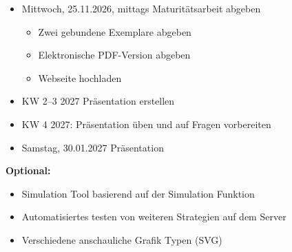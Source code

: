 \documentclass[
  ngerman,
  a4paper,
  DIV=11,
  oneside]{scrreprt}
\providecommand{\tightlist}{%
  \setlength{\itemsep}{0pt}\setlength{\parskip}{0pt}}
\begin{document}
\begin{itemize}
  \begin{itemize}
  \tightlist
  \item[$\square$]
    Abstract fertigstellen und elektronisch abgeben
  \item[$\square$]
    Titelblatt kontrollieren
  \item[$\square$]
    Inhaltsverzeichnis und Seitenzahlen kontrollieren
  \item[$\square$]
    Abbildungs- und Tabellenverzeichnis kontrollieren
  \item[$\square$]
    Literatur- und Quellenverzeichnis kontrollieren
  \item[$\square$]
    Ehrlichkeitserklärung ausfüllen, unterschreiben und als letzte Seite
    einfügen
  \item[$\square$]
    PDF exportieren und vollständig kontrollieren
  \item[$\square$]
    Zwei gebundene Exemplare drucken lassen
  \item[$\square$]
    Eigenes drittes Exemplar für die Präsentation vorbereiten
  \end{itemize}
\item[$\square$]
   Mittwoch, 25.11.2026, mittags Maturitätsarbeit
  abgeben

  \begin{itemize}
  \tightlist
  \item[$\square$]
    Zwei gebundene Exemplare abgeben
  \item[$\square$]
    Elektronische PDF-Version abgeben
  \item[$\square$]
    Webseite hochladen
  \end{itemize}
\item[$\square$]
   KW 2--3 2027 Präsentation erstellen
\item[$\square$]
   KW 4 2027: Präsentation üben und auf Fragen
  vorbereiten
\item[$\square$]
   Samstag, 30.01.2027 Präsentation
\end{itemize}

\textbf{Optional:}

\begin{itemize}
\tightlist
\item[$\square$]
   Simulation Tool basierend auf der Simulation
  Funktion
\item[$\square$]
   Automatisiertes testen von weiteren Strategien
  auf dem Server
\item[$\square$]
   Verschiedene anschauliche Grafik Typen (SVG)
\end{itemize}
\end{document}
